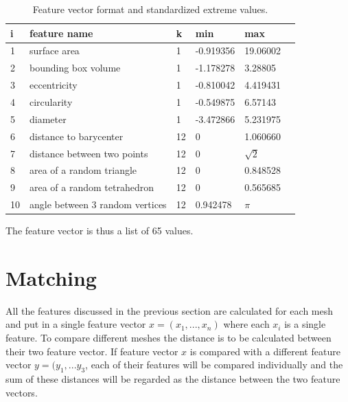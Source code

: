 \documentclass{bigdata}
\begin{document}
\begin{table}
\begin{center}
\begin{tabular}
{ l | l | l | l | l | l}
i & feature name & k & min & max\\ \hline
1 & surface area & 1 & -0.919356 & 19.06002 \\
2 & bounding box volume & 1 & -1.178278 & 3.28805\\
3 & eccentricity & 1 & -0.810042 & 4.419431\\
4 & circularity & 1 & -0.549875 & 6.57143\\
5 & diameter & 1 & -3.472866 & 5.231975\\
6 & distance to barycenter & 12 & 0 & 1.060660\\
7 & distance between two points & 12 & 0 & $\sqrt{2}$\\
8 & area of a random triangle & 12 & 0 & 0.848528 \\
9 & area of a random tetrahedron & 12 & 0 & 0.565685\\
10 & angle between 3 random vertices & 12 & 0.942478 & $\pi$\\
\end{tabular}
\end{center}
\caption{Feature vector format and standardized extreme values.}
\label{Table 2, }
\end{table}
The feature vector is thus a list of 65 values.


\section{Matching}
All the features discussed in the previous section are calculated for each mesh and put in a single feature vector $x = (x_1,...,x_n)$ where each $x_i$ is a single feature. To compare different meshes the distance is to be calculated between their two feature vector. If feature vector $x$ is compared with a different feature vector $y = (y_1,...y_3$, each of their features will be compared individually and the sum of these distances will be regarded as the distance between the two feature vectors.
\end{document}
